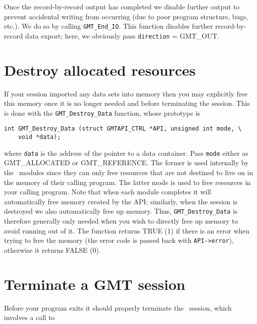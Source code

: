 \documentclass[11pt]{report}
\begin{document}
Once the record-by-record output has completed we disable further output to prevent accidental
writing from occurring (due to poor program structure, bugs, etc.).  We do so by calling \texttt{GMT\_End\_IO}.  This
function disables further record-by-record data export; here, we obviously pass \texttt{direction} = GMT\_OUT.

\section{Destroy allocated resources}

If your session imported any data sets into memory then you may explicitly free this
memory once it is no longer needed and before terminating the session.
This is done with the \texttt{GMT\_Destroy\_Data} function, whose prototype is

\begin{verbatim}
int GMT_Destroy_Data (struct GMTAPI_CTRL *API, unsigned int mode, \
    void *data);
\end{verbatim}
where \texttt{data} is the address of the pointer to a data container.
Pass \texttt{mode} either as GMT\_ALLOCATED or GMT\_REFERENCE.  The former
is used internally by the \GMT\ modules since they can only free resources that are
not destined to live on in the memory of their calling program.  The latter mode is used
to free resources in your calling program.  Note that when each module completes it will
automatically free memory created by the API; similarly, when the session is destroyed
we also automatically free up memory.  Thus, \texttt{GMT\_Destroy\_Data} is therefore
generally only needed when you wish to directly free up memory to avoid running out of it.
\index{GMT\_ALLOCATED}
The function returns TRUE (1) if there is an error when trying to free the memory
(the error code is passed back with \texttt{API->error}), otherwise it returns FALSE (0).

\section{Terminate a GMT session}

Before your program exits it should properly terminate the \GMT\ session, which involves a call to
\end{document}
